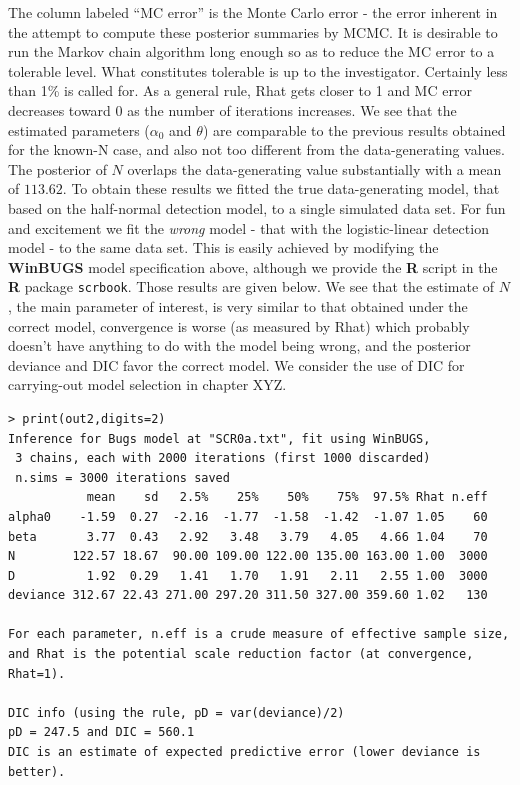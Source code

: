 The column labeled ``MC error'' is the Monte Carlo error - the error
inherent in the attempt to compute these posterior summaries by
MCMC. It is desirable to run the Markov chain algorithm long enough so
as to reduce the MC error to a tolerable level. What constitutes
tolerable is up to the investigator. Certainly less than 1\% is called
for. As a general rule, Rhat gets closer to 1 and MC error decreases
toward 0 as the number of iterations increases.  We see that the
estimated parameters ($\alpha_0$ and $\theta$) are comparable to the
previous results obtained for the known-N case, and also not too
different from the data-generating values. The posterior of $N$
overlaps the data-generating value substantially with a mean of
$113.62$.  To obtain these results we fitted the true data-generating
model, that based on the half-normal detection model, to a single
simulated data set. For fun and excitement we fit the {\it wrong}
model - that with the logistic-linear detection model - to the same
data set. This is easily achieved by modifying the {\bf WinBUGS} model
specification above, although we provide the {\bf R} script in the
{\bf R} package \mbox{\tt scrbook}.
Those results are given below. We see that the estimate of
$N$, the main parameter of interest, is very similar to that obtained
under the correct model, convergence is worse (as measured by Rhat)
which probably doesn't have anything to do with the model being wrong,
and the posterior deviance and DIC favor the correct model. We
consider the use of DIC for carrying-out model selection in chapter
XYZ.
{\small
\begin{verbatim}
> print(out2,digits=2)
Inference for Bugs model at "SCR0a.txt", fit using WinBUGS,
 3 chains, each with 2000 iterations (first 1000 discarded)
 n.sims = 3000 iterations saved
           mean    sd   2.5%    25%    50%    75%  97.5% Rhat n.eff
alpha0    -1.59  0.27  -2.16  -1.77  -1.58  -1.42  -1.07 1.05    60
beta       3.77  0.43   2.92   3.48   3.79   4.05   4.66 1.04    70
N        122.57 18.67  90.00 109.00 122.00 135.00 163.00 1.00  3000
D          1.92  0.29   1.41   1.70   1.91   2.11   2.55 1.00  3000
deviance 312.67 22.43 271.00 297.20 311.50 327.00 359.60 1.02   130

For each parameter, n.eff is a crude measure of effective sample size,
and Rhat is the potential scale reduction factor (at convergence, Rhat=1).

DIC info (using the rule, pD = var(deviance)/2)
pD = 247.5 and DIC = 560.1
DIC is an estimate of expected predictive error (lower deviance is better).
\end{verbatim}
}

